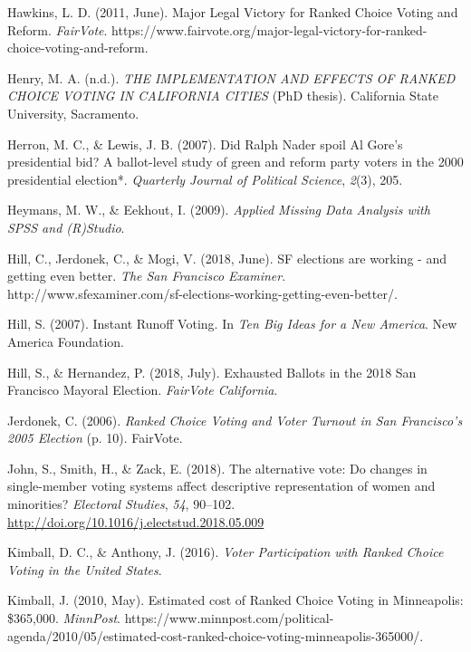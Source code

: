 \documentclass[12pt,twoside]{reedthesis}
\begin{document}
\leavevmode\hypertarget{ref-hawkins_major_2011}{}%
Hawkins, L. D. (2011, June). Major Legal Victory for Ranked Choice Voting and Reform. \emph{FairVote}. https://www.fairvote.org/major-legal-victory-for-ranked-choice-voting-and-reform.

\leavevmode\hypertarget{ref-henry_implementation_2016}{}%
Henry, M. A. (n.d.). \emph{THE IMPLEMENTATION AND EFFECTS OF RANKED CHOICE VOTING IN CALIFORNIA CITIES} (PhD thesis). California State University, Sacramento.

\leavevmode\hypertarget{ref-herron_did_2007}{}%
Herron, M. C., \& Lewis, J. B. (2007). Did Ralph Nader spoil Al Gore's presidential bid? A ballot-level study of green and reform party voters in the 2000 presidential election*. \emph{Quarterly Journal of Political Science}, \emph{2}(3), 205.

\leavevmode\hypertarget{ref-heymans_applied_2009}{}%
Heymans, M. W., \& Eekhout, I. (2009). \emph{Applied Missing Data Analysis with SPSS and (R)Studio}.

\leavevmode\hypertarget{ref-hill_sf_2018}{}%
Hill, C., Jerdonek, C., \& Mogi, V. (2018, June). SF elections are working - and getting even better. \emph{The San Francisco Examiner}. http://www.sfexaminer.com/sf-elections-working-getting-even-better/.

\leavevmode\hypertarget{ref-hill_instant_2007}{}%
Hill, S. (2007). Instant Runoff Voting. In \emph{Ten Big Ideas for a New America}. New America Foundation.

\leavevmode\hypertarget{ref-hill_exhausted_2018}{}%
Hill, S., \& Hernandez, P. (2018, July). Exhausted Ballots in the 2018 San Francisco Mayoral Election. \emph{FairVote California}.

\leavevmode\hypertarget{ref-jerdonek_ranked_2006}{}%
Jerdonek, C. (2006). \emph{Ranked Choice Voting and Voter Turnout in San Francisco's 2005 Election} (p. 10). FairVote.

\leavevmode\hypertarget{ref-john_alternative_2018}{}%
John, S., Smith, H., \& Zack, E. (2018). The alternative vote: Do changes in single-member voting systems affect descriptive representation of women and minorities? \emph{Electoral Studies}, \emph{54}, 90--102. \url{http://doi.org/10.1016/j.electstud.2018.05.009}

\leavevmode\hypertarget{ref-kimball_voter_2016}{}%
Kimball, D. C., \& Anthony, J. (2016). \emph{Voter Participation with Ranked Choice Voting in the United States}.

\leavevmode\hypertarget{ref-kimball_estimated_2010}{}%
Kimball, J. (2010, May). Estimated cost of Ranked Choice Voting in Minneapolis: \$365,000. \emph{MinnPost}. https://www.minnpost.com/political-agenda/2010/05/estimated-cost-ranked-choice-voting-minneapolis-365000/.
\end{document}
